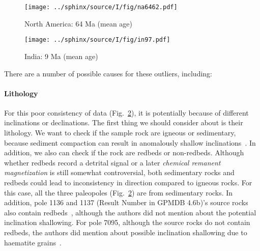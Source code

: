 \begin{figure*}[tbp]
  \captionsetup[subfigure]{labelformat=empty,aboveskip=-6pt,belowskip=-6pt}
  \centering
  \begin{subfigure}[htbp]{.49\textwidth}
    \captionsetup{skip=0pt}  %
    \centering
    \texttt{[image: ../sphinx/source/I/fig/na6462.pdf]}
    \caption{North America: 64 Ma (mean age)}\label{Fig:chap_intro_na6462agemean}
  \end{subfigure}
  \begin{subfigure}[htbp]{.49\textwidth}
    \captionsetup{skip=0pt}
    \centering
    \texttt{[image: ../sphinx/source/I/fig/in97.pdf]}
    \caption{India: 9 Ma (mean age)}\label{Fig:chap_intro_in97agemean}
  \end{subfigure}
  \caption[Example of AMP moving averaging effects]{Overlapping and further
  separated paleopoles of the NAC\@ and India. The oval ellipses are their 95\%
  confidence uncertainties. The labels are their result number given in GPMDB
  4.6b.}\label{Fig:chap_intro_ma-amp}
\end{figure*}

There are a number of possible causes for these outliers, including:

\paragraph{Lithology}

For this poor consistency of data (Fig.~\ref{Fig:chap_intro_in97agemean}), it is
potentially because of different inclinations or declinations. The first thing
we should consider about is their lithology. We want to check if the sample rock
are igneous or sedimentary, because sediment compaction can result in
anomalously shallow inclinations~\citep{T20}. In addition, we also can check if
the rock are redbeds or non-redbeds. Although whether redbeds record a detrital
signal or a later \emph{chemical remanent magnetization} is still somewhat
controversial, both sedimentary rocks and redbeds could lead to inconsistency in
direction compared to igneous rocks. For this case, all the three paleopoles
(Fig.~\ref{Fig:chap_intro_in97agemean}) are from sedimentary rocks. In addition,
pole 1136 and 1137 (Result Number in GPMDB 4.6b)'s source rocks also contain
redbeds~\citep{O82}, although the authors did not mention about the potential
inclination shallowing. For pole 7095, although the source rocks do not contain
redbeds, the authors did mention about possible inclination shallowing due to
haematite grains~\citep{G94}.

